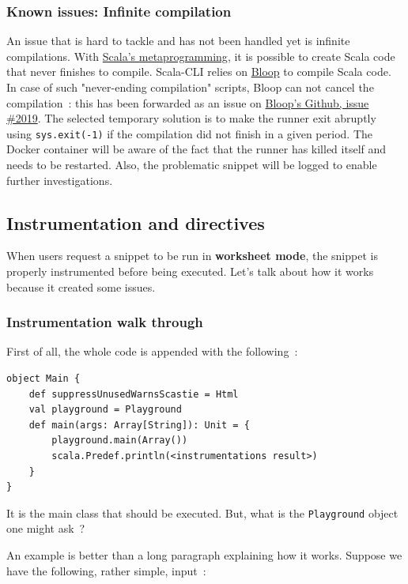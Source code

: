 \documentclass{article}
\begin{document}
\subsubsection{Known issues: Infinite compilation}

An issue that is hard to tackle and has not been handled yet is infinite compilations. With \href{https://docs.scala-lang.org/scala3/reference/metaprogramming/index.html}{Scala's metaprogramming}, it is possible to create Scala code that never finishes to compile. Scala-CLI relies on \href{https://scalacenter.github.io/bloop/}{Bloop} to compile Scala code. In case of such "never-ending compilation" scripts, Bloop can not cancel the compilation~: this has been forwarded as an issue on \href{https://github.com/scalacenter/bloop/issues/2019}{Bloop's Github, issue \#2019}. The selected temporary solution is to make the runner exit abruptly using \lstinline{sys.exit(-1)} if the compilation did not finish in a given period. The Docker container will be aware of the fact that the runner has killed itself and needs to be restarted. Also, the problematic snippet will be logged to enable further investigations.

\subsection{Instrumentation and directives}

When users request a snippet to be run in \textbf{worksheet mode}, the snippet is properly instrumented before being executed. Let's talk about how it works because it created some issues.

\subsubsection{Instrumentation walk through}

First of all, the whole code is appended with the following~:

\begin{lstlisting}
object Main {
    def suppressUnusedWarnsScastie = Html
    val playground = Playground
    def main(args: Array[String]): Unit = {
        playground.main(Array())
        scala.Predef.println(<instrumentations result>)
    }
}
\end{lstlisting}

It is the main class that should be executed. But, what is the \lstinline{Playground} object one might ask~?

An example is better than a long paragraph explaining how it works. Suppose we have the following, rather simple, input~:
\end{document}
